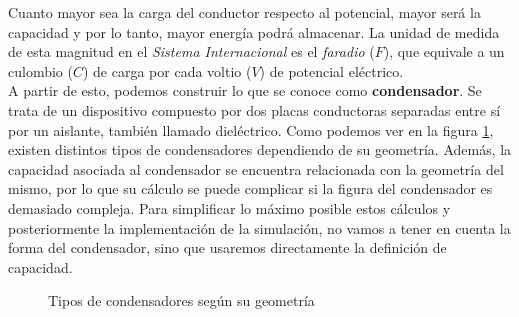 \documentclass[../main.tex]{subfiles}
\begin{document}
Cuanto mayor sea la carga del conductor respecto al potencial, mayor será la capacidad y por lo tanto, mayor energía podrá almacenar. La unidad de medida de esta magnitud en el \textit{Sistema Internacional} es el \textit{faradio} ($F$), que equivale a un culombio ($C$) de carga por cada voltio ($V$) de potencial eléctrico. \\

A partir de esto, podemos construir lo que se conoce como \textbf{condensador}. Se trata de un dispositivo compuesto por dos placas conductoras separadas entre sí por un aislante, también llamado dieléctrico. Como podemos ver en la figura \ref{fig::tipos-condensadores-geometria}, existen distintos tipos de condensadores dependiendo de su geometría. Además, la capacidad asociada al condensador se encuentra relacionada con la geometría del mismo, por lo que su cálculo se puede complicar si la figura del condensador es demasiado compleja. Para simplificar lo máximo posible estos cálculos y posteriormente la implementación de la simulación, no vamos a tener en cuenta la forma del condensador, sino que usaremos directamente la definición de capacidad.\\


 \begin{figure}[!h]
    \centering
    \caption{Tipos de condensadores según su geometría}
    \label{fig::tipos-condensadores-geometria}
\end{figure}
\end{document}
